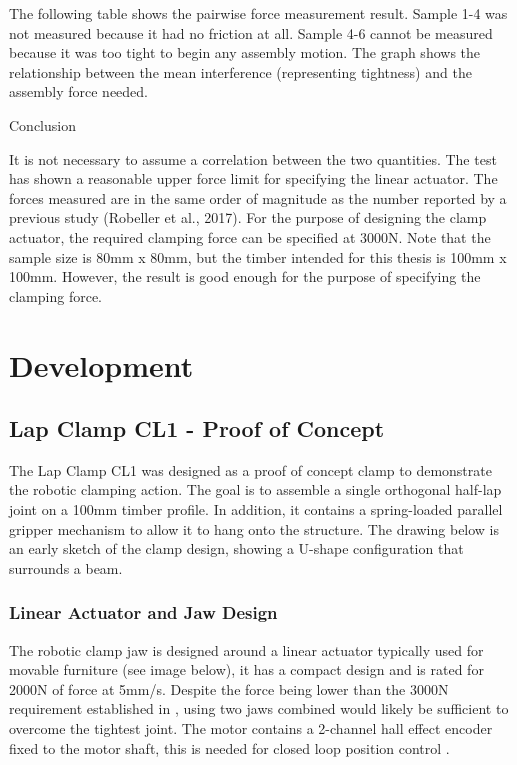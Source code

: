 The following table shows the pairwise force measurement result. Sample 1-4 was not measured because it had no friction at all. Sample 4-6 cannot be measured because it was too tight to begin any assembly motion. The graph shows the relationship between the mean interference (representing tightness) and the assembly force needed. 

Conclusion

It is not necessary to assume a correlation between the two quantities. The test has shown a reasonable upper force limit for specifying the linear actuator. The forces measured are in the same order of magnitude as the number reported by a previous study (Robeller et al., 2017). For the purpose of designing the clamp actuator, the required clamping force can be specified at 3000N. 
Note that the sample size is 80mm x 80mm, but the timber intended for this thesis is 100mm x 100mm. However, the result is good enough for the purpose of specifying the clamping force.

\section{Development}
\label{section:exploration-1-development}

\subsection{Lap Clamp CL1 - Proof of Concept}
\label{subsection:exploration-1-lap-clamp-cl1-proof-of-concept}

The Lap Clamp CL1 was designed as a proof of concept clamp to demonstrate the robotic clamping action. The goal is to assemble a single orthogonal half-lap joint on a 100mm timber profile. 
In addition, it contains a spring-loaded parallel gripper mechanism to allow it to hang onto the structure. The drawing below is an early sketch of the clamp design, showing a U-shape configuration that surrounds a beam.

\subsubsection{Linear Actuator and Jaw Design}
\label{subsubsection:exploration-1-linear-actuator-and-jaw-design}

The robotic clamp jaw is designed around a linear actuator typically used for movable furniture (see image below), it has a compact design and is rated for 2000N of force at 5mm/s. Despite the force being lower than the 3000N requirement established in , using two jaws combined would likely be sufficient to overcome the tightest joint. The motor contains a 2-channel hall effect encoder fixed to the motor shaft, this is needed for closed loop position control . 


